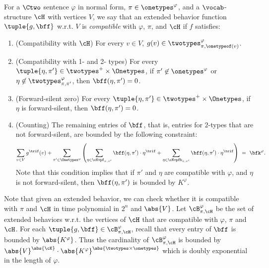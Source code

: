 \begin{definition}\label{def:compatextended}
    For a $\Ctwo$ sentence $\varphi$ in normal form,
    $\pi \in \onetypes^\varphi$, and
    a $\vocab$-structure $\cH$ with vertices $V$,
    we say that an extended behavior function $\tuple{g, \bff}$ w.r.t. $V$ is
    \emph{compatible} with $\varphi$, $\pi$, and $\cH$
    if $f$ satisfies:
    \begin{enumerate}
        \item (Compatibility with $\cH$)
        For every $v \in V$, $g(v) \in \twotypes^\varphi_{\pi, \onetypeof(v)}$.

        \item (Compatibility with 1- and 2- types)
        For every $\tuple{\eta, \pi'} \in \twotypes^+ \times \Onetypes$,
        if $\pi' \not\in \onetypes^\varphi$ or 
        $\eta \not\in \twotypes^\varphi_{\pi, \pi'}$,
        then $\bff(\eta, \pi') = 0$.

        \item (Forward-silent zero)
        For every $\tuple{\eta, \pi'} \in \twotypes^+ \times \Onetypes$,
        if $\eta$ is forward-silent,
        then $\bff(\eta, \pi') = 0$.
       
        \item (Counting) The remaining entries of $\bff$,
        that is, entries for $2$-types that are not forward-silent, are bounded by the following constraint:
        \begin{equation*}
            \sum_{v \in V} g^\trif(v) + 
            \sum_{\pi' \in \Onetypes^\varphi}
            \left(
                \sum_{\eta \in \cKvpf_{\pi, \pi'}} \bff(\eta, \pi') \cdot \eta^\trif +
                \sum_{\eta \in \cKvpfb_{\pi, \pi'}} \bff(\eta, \pi') \cdot \eta^\trif
            \right)
            \ =\ \bfk^\varphi.
        \end{equation*}
        Note that this condition implies that
        if $\pi'$ and $\eta$ are compatible with $\varphi$, and
        $\eta$ is not forward-silent,
        then $\bff(\eta, \pi')$ is bounded by $K^\varphi$.
    \end{enumerate}
\end{definition}

Note that given an extended behavior,
we can check whether it is compatible with $\pi$ and $\cH$ in time polynomial in $2^n$ and $\abs{V}$.
Let $\cB^{\varphi}_{\pi, \cH}$ be the set of extended behaviors w.r.t. 
the vertices of $\cH$ that are compatible with $\varphi$, $\pi$ and $\cH$.
For each $\tuple{g, \bff} \in \cB^{\varphi}_{\pi, \cH}$,
recall that every entry of $\bff$ is bounded by $\abs{K^\varphi}$.
Thus the cardinality of $\cB^{\varphi}_{\pi, \cH}$ is bounded by
$\abs{V}^\abs{\cK} \cdot \abs{K^\varphi}^\abs{\twotypes \times \onetypes}$
which is doubly exponential in the length of $\varphi$.

